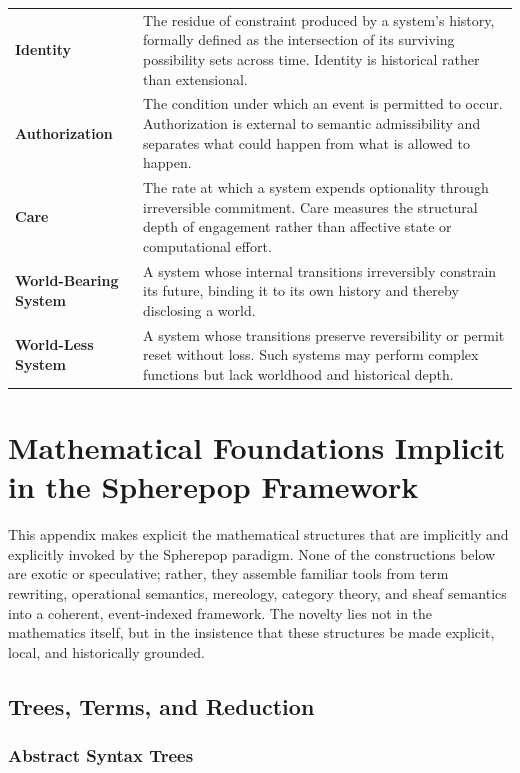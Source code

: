 \documentclass[11pt]{article}
\begin{document}
\begin{longtable}{p{3.5cm} p{10.5cm}}
\textbf{Identity} &
The residue of constraint produced by a system’s history, formally defined as the intersection of its surviving possibility sets across time. Identity is historical rather than extensional. \\[8pt]

\textbf{Authorization} &
The condition under which an event is permitted to occur. Authorization is external to semantic admissibility and separates what could happen from what is allowed to happen. \\[8pt]

\textbf{Care} &
The rate at which a system expends optionality through irreversible commitment. Care measures the structural depth of engagement rather than affective state or computational effort. \\[8pt]

\textbf{World-Bearing System} &
A system whose internal transitions irreversibly constrain its future, binding it to its own history and thereby disclosing a world. \\[8pt]

\textbf{World-Less System} &
A system whose transitions preserve reversibility or permit reset without loss. Such systems may perform complex functions but lack worldhood and historical depth. \\

\end{longtable}


\newpage
\appendix
\section{Mathematical Foundations Implicit in the Spherepop Framework}

This appendix makes explicit the mathematical structures that are implicitly and explicitly invoked by the Spherepop paradigm. None of the constructions below are exotic or speculative; rather, they assemble familiar tools from term rewriting, operational semantics, mereology, category theory, and sheaf semantics into a coherent, event-indexed framework. The novelty lies not in the mathematics itself, but in the insistence that these structures be made explicit, local, and historically grounded.

\subsection{Trees, Terms, and Reduction}

\subsubsection{Abstract Syntax Trees}
\end{document}
